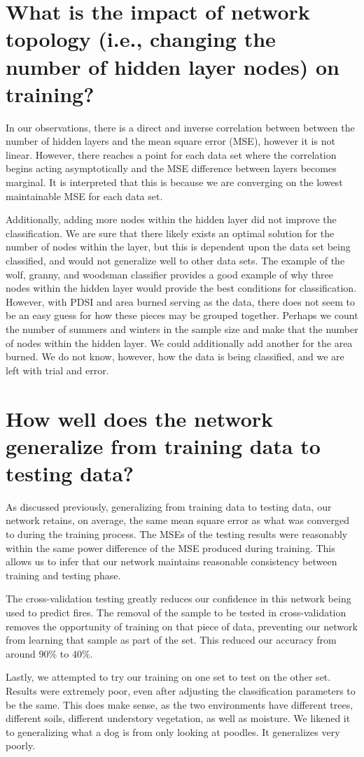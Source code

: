 \documentclass[10pt,a4paper,twocolumn,notitlepage]{article}
\begin{document}
\section*{What is the impact of network topology (i.e., changing the number of hidden layer nodes) on training?}
In our observations, there is a direct and inverse correlation between between the number of hidden layers and the mean square error (MSE), however it is not linear. However, there reaches a point for each data set where the correlation begins acting asymptotically and the MSE difference between layers becomes marginal. It is interpreted that this is because we are converging on the lowest maintainable MSE for each data set.\par
Additionally, adding more nodes within the hidden layer did not improve the classification. We are sure that there likely exists an optimal solution for the number of nodes within the layer, but this is dependent upon the data set being classified, and would not generalize well to other data sets. The example of the wolf, granny, and woodsman classifier provides a good example of why three nodes within the hidden layer would provide the best conditions for classification. However, with PDSI and area burned serving as the data, there does not seem to be an easy guess for how these pieces may be grouped together. Perhaps we count the number of summers and winters in the sample size and make that the number of nodes within the hidden layer. We could additionally add another for the area burned. We do not know, however, how the data is being classified, and we are left with trial and error.\par


\section*{How well does the network generalize from training data to testing data?}
As discussed previously, generalizing from training data to testing data, our network retains, on average, the same mean square error as what was converged to during the training process. The MSEs of the testing results were reasonably within the same power difference of the MSE produced during training. This allows us to infer that our network maintains reasonable consistency between training and testing phase.\par
The cross-validation testing greatly reduces our confidence in this network being used to predict fires. The removal of the sample to be tested in cross-validation removes the opportunity of training on that piece of data, preventing our network from learning that sample as part of the set. This reduced our accuracy from around 90\% to 40\%.\par 
Lastly, we attempted to try our training on one set to test on the other set. Results were extremely poor, even after adjusting the classification parameters to be the same. This does make sense, as the two environments have different trees, different soils, different understory vegetation, as well as moisture. We likened it to generalizing what a dog is from only looking at poodles. It generalizes very poorly.\par 
\end{document}
